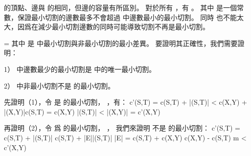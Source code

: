 \startANSWER
{} 的頂點、邊與  的相同，但邊的容量有所區別。
對於所有 ，有 。
其中 \m{\sigma} 是一個常數，保證最小切割的邊數最多不會超過  中邊數最小的最小切割。
同時 \m{\sigma} 也不能太大，因爲在減少最小切割邊數的同時可能導致切割不再是最小切割。

\startformula
\sigma = 
\stopformula
其中  是  中最小切割與非最小切割的最小差異。
要證明其正確性，我們需要證明：

1）  中邊數最少的最小切割是  中的唯一最小切割。

2）  中非最小切割不是  的最小切割。

先證明（1），令  是  的最小切割， ，有：
\startformula\startmathalignment
\NC c'(S,T) \NC = c(S,T) + |(S,T)|\sigma \NR
\NC \NC < c(X,Y) + |(X,Y)|\sigma \qquad c(S,T) = c(X,Y)  |(S,T)| < |(X,Y)| \NR
\NC \NC = c'(X,Y) \NR
\stopmathalignment\stopformula

再證明（2），令  爲  的最小切割， ，
我們來證明  不是  的最小切割：
\startformula\startmathalignment
\NC c'(S,T) \NC = c(S,T) + |(S,T)|\sigma \NR
\NC \NC \le c(S,T) + |E|\sigma \qquad |(S,T)| \le |E| \NR
\NC \NC = c(S,T) +  \NR
\NC \NC \le c(X,Y) \qquad c(X,Y) - c(S,T) \ge m \NR
\NC \NC < c'(X,Y) \NR
\stopmathalignment\stopformula

\stopANSWER

\stopsection
